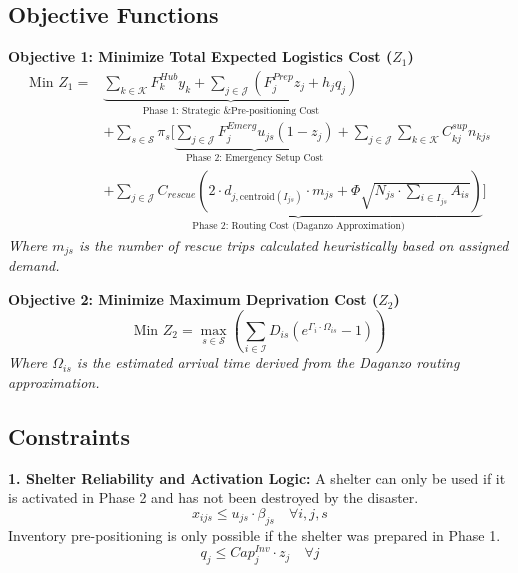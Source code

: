\subsection*{Objective Functions}

\noindent \textbf{Objective 1: Minimize Total Expected Logistics Cost ($Z_1$)}
\begin{equation}
\begin{aligned}
    \text{Min } Z_1 = & \underbrace{\sum_{k \in \mathcal{K}} F_k^{Hub} y_k + \sum_{j \in \mathcal{J}} (F_j^{Prep} z_j + h_j q_j)}_{\text{Phase 1: Strategic \& Pre-positioning Cost}} \\
    & + \sum_{s \in \mathcal{S}} \pi_s \Bigg[ \underbrace{\sum_{j \in \mathcal{J}} F_j^{Emerg} u_{js}(1 - z_j)}_{\text{Phase 2: Emergency Setup Cost}} 
    + \sum_{j \in \mathcal{J}} \sum_{k \in \mathcal{K}} C_{kj}^{sup} n_{kjs} \\
    & + \underbrace{\sum_{j \in \mathcal{J}} C_{rescue} \left( 2 \cdot d_{j, \text{centroid}(I_{js})} \cdot m_{js} + \Phi \sqrt{N_{js} \cdot \sum_{i \in I_{js}} A_{is}} \right)}_{\text{Phase 2: Routing Cost (Daganzo Approximation)}} \Bigg]
\end{aligned}
\end{equation}
\noindent \textit{Where $m_{js}$ is the number of rescue trips calculated heuristically based on assigned demand.}

\noindent \textbf{Objective 2: Minimize Maximum Deprivation Cost ($Z_2$)}
\begin{equation}
    \text{Min } Z_2 = \max_{s \in \mathcal{S}} \left( \sum_{i \in \mathcal{I}} D_{is} \left( e^{\Gamma_i \cdot \Omega_{is}} - 1 \right) \right)
\end{equation}
\noindent \textit{Where $\Omega_{is}$ is the estimated arrival time derived from the Daganzo routing approximation.}

\subsection*{Constraints}

\noindent \textbf{1. Shelter Reliability and Activation Logic:}
A shelter can only be used if it is activated in Phase 2 and has not been destroyed by the disaster.
\begin{equation}
    x_{ijs} \le u_{js} \cdot \beta_{js} \quad \forall i, j, s
\end{equation}
Inventory pre-positioning is only possible if the shelter was prepared in Phase 1.
\begin{equation}
    q_j \le Cap_j^{Inv} \cdot z_j \quad \forall j
\end{equation}

